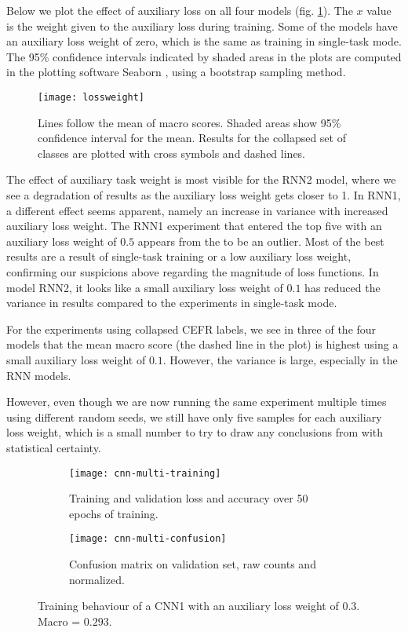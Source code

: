 Below we plot the effect of auxiliary loss on all four models (fig.
\ref{fig:lossweight}). The $x$ value is the weight given to the auxiliary
loss during training. Some of the models have an auxiliary loss weight of
zero, which is the same as training in single-task mode. The 95\% confidence
intervals indicated by shaded areas in the plots are computed in the plotting
software Seaborn \autocite{seaborn}, using a bootstrap sampling method.

\begin{figure}
  \centering
  \texttt{[image: lossweight]}
  \caption[Performance of multi-task models]{
    Lines follow the mean of macro \FI scores. Shaded areas show 95\%
    confidence interval for the mean. Results for the collapsed set of
    classes are plotted with cross symbols and dashed lines.
  }
  \label{fig:lossweight}
\end{figure}

The effect of auxiliary task weight is most visible for the RNN2 model, where
we see a degradation of results as the auxiliary loss weight gets closer to
1. In RNN1, a different effect seems apparent, namely an increase in variance
with increased auxiliary loss weight. The RNN1 experiment that entered the
top five with an auxiliary loss weight of $0.5$ appears from the to be an
outlier. Most of the best results are a result of single-task training or a
low auxiliary loss weight, confirming our suspicions above regarding the
magnitude of loss functions. In model RNN2, it looks like a small auxiliary
loss weight of $0.1$ has reduced the variance in results compared to the
experiments in single-task mode.

For the experiments using collapsed CEFR labels, we see in three of the four
models that the mean macro \FI score (the dashed line in the plot) is highest
using a small auxiliary loss weight of $0.1$. However, the variance is large,
especially in the RNN models.

However, even though we are now running the same experiment multiple times
using different random seeds, we still have only five samples for each
auxiliary loss weight, which is a small number to try to draw any conclusions
from with statistical certainty.

\begin{figure}
  \begin{subfigure}{\linewidth}
    \centering
    \texttt{[image: cnn-multi-training]}
    \caption{Training and validation loss and accuracy over 50 epochs of training.}
  \end{subfigure}
  \begin{subfigure}{\linewidth}
    \centering
    \texttt{[image: cnn-multi-confusion]}
    \caption{Confusion matrix on validation set, raw counts and normalized.}
  \end{subfigure}
  \caption[Training behaviour of a multi-task CNN]{
    Training behaviour of a CNN1 with an auxiliary loss weight of $0.3$.
    Macro \FI = $0.293$.
  }
  \label{fig:cnn-multi-training}
\end{figure}


